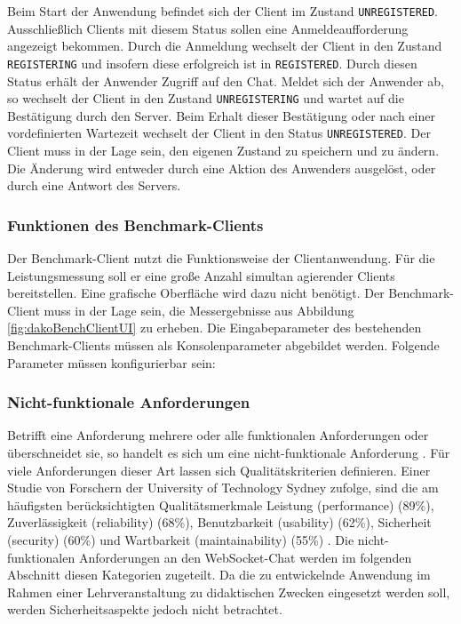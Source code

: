 \documentclass[11pt,a4paper,titlepage]{scrartcl}
\numberwithin{equation}{section}
\begin{document}
\noindent Beim Start der Anwendung befindet sich der Client im Zustand \texttt{UNREGISTERED}. Ausschließlich Clients mit diesem Status sollen eine Anmeldeaufforderung angezeigt bekommen. Durch die Anmeldung wechselt der Client in den Zustand \texttt{REGISTERING} und insofern diese erfolgreich ist in \texttt{REGISTERED}. Durch diesen Status erhält der Anwender Zugriff auf den Chat. Meldet sich der Anwender ab, so wechselt der Client in den Zustand \texttt{UNREGISTERING} und wartet auf die Bestätigung durch den Server. Beim Erhalt dieser Bestätigung oder nach einer vordefinierten Wartezeit wechselt der Client in den Status \texttt{UNREGISTERED}. Der Client muss in der Lage sein, den eigenen Zustand zu speichern und zu ändern. Die Änderung wird entweder durch eine Aktion des Anwenders ausgelöst, oder durch eine Antwort des Servers.   

\subsubsection*{Funktionen des Benchmark-Clients}
Der Benchmark-Client nutzt die Funktionsweise der Clientanwendung. Für die Leistungsmessung soll er eine große Anzahl simultan agierender Clients bereitstellen. Eine grafische Oberfläche wird dazu nicht benötigt. Der Benchmark-Client muss in der Lage sein, die Messergebnisse aus Abbildung \ref{fig:dakoBenchClientUI} zu erheben. Die Eingabeparameter des bestehenden Benchmark-Clients müssen als Konsolenparameter abgebildet werden. Folgende Parameter müssen konfigurierbar sein:
\begin{itemize}
\end{itemize}


\subsubsection{Nicht-funktionale Anforderungen}
Betrifft eine Anforderung mehrere oder alle funktionalen Anforderungen oder überschneidet sie, so handelt es sich um eine nicht-funktionale Anforderung \autocite[109]{balzert_lehrbuch_2011}. Für viele Anforderungen dieser Art lassen sich Qualitätskriterien definieren. Einer Studie von Forschern der University of Technology Sydney zufolge, sind die am häufigsten berücksichtigten Qualitätsmerkmale Leistung (performance) (89\%), Zuverlässigkeit (reliability) (68\%), Benutzbarkeit (usability) (62\%), Sicherheit (security) (60\%) und Wartbarkeit (maintainability) (55\%) \autocite[314]{mairiza_investigation_2010}. Die nicht-funktionalen Anforderungen an den WebSocket-Chat werden im folgenden Abschnitt diesen Kategorien zugeteilt. Da die zu entwickelnde Anwendung im Rahmen einer Lehrveranstaltung zu didaktischen Zwecken eingesetzt werden soll, werden Sicherheitsaspekte jedoch nicht betrachtet.
\end{document}
